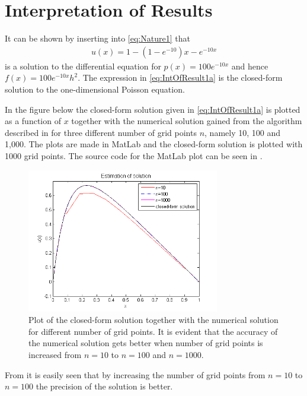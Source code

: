 \section{Interpretation of Results}
\label{sec:InterpretationOfResults}
It can be shown by inserting into \eqref{eq:Nature1} that 
\begin{align}
	u(x) = 1-(1-e^{-10})x-e^{-10x}
	\label{eq:IntOfResult1a}
\end{align}
is a solution to the differential equation for $p(x)=100e^{-10x}$ and hence $f(x)=100e^{-10x} h^2$. 
The expression in \eqref{eq:IntOfResult1a} is the closed-form solution to the one-dimensional Poisson equation.

In the figure below the closed-form solution given in \eqref{eq:IntOfResult1a} is plotted as a function of $x$ together with the numerical solution gained from the algorithm described in  for three different number of grid points $n$, namely 10, 100 and 1,000.  
The plots are made in MatLab and the closed-form solution is plotted with 1000 grid points. 
The source code for the MatLab plot can be seen in .
\begin{figure}[H]
	\centering
	\includegraphics[width=0.75\textwidth]{Figures/estimaition_of_solution.png}
	\caption{Plot of the closed-form solution together with the numerical solution for different number of grid points. It is evident that the accuracy of the numerical solution gets better when number of grid points is increased from $n=10$ to $n=100$ and $n=1000$.}
	\label{fig:IntOfResult1}
\end{figure}
From  it is easily seen that by increasing the number of grid points from $n=10$ to $n=100$ the precision of the solution is better. 

